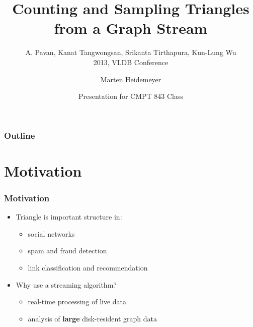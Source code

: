 \documentclass[11pt]{beamer}
\title[Counting and Sampling Triangles from a Graph Stream] %
{Counting and Sampling Triangles from a Graph Stream}
\subtitle{A. Pavan, Kanat Tangwongsan, Srikanta Tirthapura, Kun-Lung Wu\\2013, VLDB Conference}
\author[] %
{Marten Heidemeyer}
\date[\today] %
{Presentation for CMPT 843 Class}
\begin{document}
\frame{\titlepage}
\begin{frame}
\frametitle{Outline}
\tableofcontents[]
\end{frame}
\section{Motivation}
\begin{frame}
\frametitle{Motivation}
\begin{itemize}
\item Triangle is important structure in:
\begin{itemize}
\item social networks
\item spam and fraud detection
\item link classification and recommendation
\end{itemize}
\item Why use a streaming algorithm?
\begin{itemize}
\item real-time processing of live data
\item analysis of \textbf{large} disk-resident graph data
\end{itemize}
\end{itemize}
\end{frame}
\end{document}
